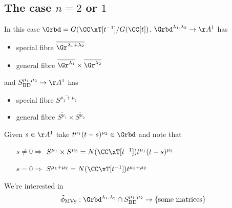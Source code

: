 
\subsection{The case $n=2$ or $1$}

In this case $\Grbd = G(\CC\xT[t^{-1}]/G(\CC[t])$. 
$\Grbd^{\lambda_1,\lambda_2}\to\AA^1$ has 
\begin{itemize}
    \item special fibre $\overline{\Gr^{\lambda_1 + \lambda_2}}$
    \item general fibre $\overline{\Gr^{\lambda_1}}\times\overline{\Gr^{\lambda_2}}$
\end{itemize}
% 
and $S^{\mu_1,\mu_2}_{\mathrm{BD}}\to\AA^1$ has 
\begin{itemize}
    \item special fibre $\overline{S^{\mu_1+\mu_2}}$
    \item general fibre $\overline{S^{\mu_1}}\times \overline{S^{\mu_2}}$
\end{itemize}

Given $s\in \AA^1$ take $t^{\mu_1}(t-s)^{\mu_2} \in \Grbd$ and note that 
\begin{itemize}
    \item[$s\ne 0\Rightarrow$] $S^{\mu_1}\times S^{\mu_2} = N(\CC\xT[t^{-1}])t^{\mu_1}(t-s)^{\mu_2}$
    \item[$s = 0\Rightarrow$] $S^{\mu_1+\mu_2} = N(\CC\xT[t^{-1}])t^{\mu_1 + \mu_2}$
\end{itemize}


We're interested in
\begin{equation}
\label{eq:topmvy2}
    \tilde\phi_{\mathrm{MVy}}:\Grbd^{\lambda_1,\lambda_2}\cap S^{\mu_1,\mu_2}_{\mathrm{BD}} \to \{\text{some matrices}\}
\end{equation}